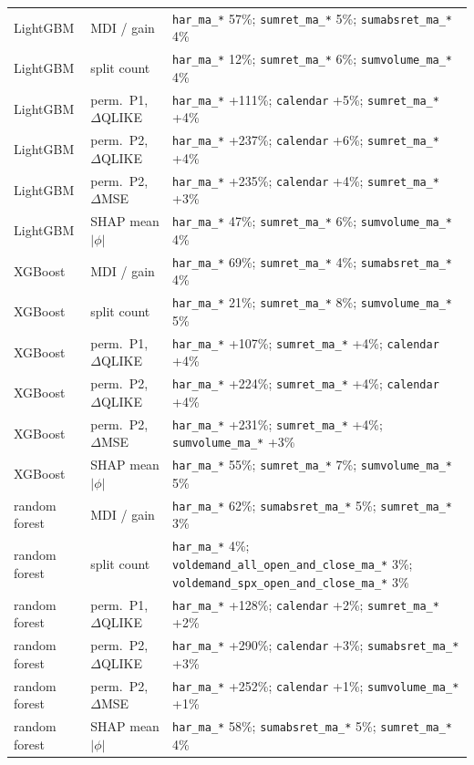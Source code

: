 \documentclass[10pt]{article}
\begin{document}
\begin{table}[H]
\begin{tabular}{llp{11.2cm}}
LightGBM & MDI / gain & \texttt{har\_ma\_*} 57\%; \texttt{sumret\_ma\_*} 5\%; \texttt{sumabsret\_ma\_*} 4\% \\
LightGBM & split count & \texttt{har\_ma\_*} 12\%; \texttt{sumret\_ma\_*} 6\%; \texttt{sumvolume\_ma\_*} 4\% \\
LightGBM & perm.\ P1, $\Delta$QLIKE & \texttt{har\_ma\_*} +111\%; \texttt{calendar} +5\%; \texttt{sumret\_ma\_*} +4\% \\
LightGBM & perm.\ P2, $\Delta$QLIKE & \texttt{har\_ma\_*} +237\%; \texttt{calendar} +6\%; \texttt{sumret\_ma\_*} +4\% \\
LightGBM & perm.\ P2, $\Delta$MSE & \texttt{har\_ma\_*} +235\%; \texttt{calendar} +4\%; \texttt{sumret\_ma\_*} +3\% \\
LightGBM & SHAP mean $|\phi|$ & \texttt{har\_ma\_*} 47\%; \texttt{sumret\_ma\_*} 6\%; \texttt{sumvolume\_ma\_*} 4\% \\
XGBoost & MDI / gain & \texttt{har\_ma\_*} 69\%; \texttt{sumret\_ma\_*} 4\%; \texttt{sumabsret\_ma\_*} 4\% \\
XGBoost & split count & \texttt{har\_ma\_*} 21\%; \texttt{sumret\_ma\_*} 8\%; \texttt{sumvolume\_ma\_*} 5\% \\
XGBoost & perm.\ P1, $\Delta$QLIKE & \texttt{har\_ma\_*} +107\%; \texttt{sumret\_ma\_*} +4\%; \texttt{calendar} +4\% \\
XGBoost & perm.\ P2, $\Delta$QLIKE & \texttt{har\_ma\_*} +224\%; \texttt{sumret\_ma\_*} +4\%; \texttt{calendar} +4\% \\
XGBoost & perm.\ P2, $\Delta$MSE & \texttt{har\_ma\_*} +231\%; \texttt{sumret\_ma\_*} +4\%; \texttt{sumvolume\_ma\_*} +3\% \\
XGBoost & SHAP mean $|\phi|$ & \texttt{har\_ma\_*} 55\%; \texttt{sumret\_ma\_*} 7\%; \texttt{sumvolume\_ma\_*} 5\% \\
random forest & MDI / gain & \texttt{har\_ma\_*} 62\%; \texttt{sumabsret\_ma\_*} 5\%; \texttt{sumret\_ma\_*} 3\% \\
random forest & split count & \texttt{har\_ma\_*} 4\%; \texttt{voldemand\_all\_open\_and\_close\_ma\_*} 3\%; \texttt{voldemand\_spx\_open\_and\_close\_ma\_*} 3\% \\
random forest & perm.\ P1, $\Delta$QLIKE & \texttt{har\_ma\_*} +128\%; \texttt{calendar} +2\%; \texttt{sumret\_ma\_*} +2\% \\
random forest & perm.\ P2, $\Delta$QLIKE & \texttt{har\_ma\_*} +290\%; \texttt{calendar} +3\%; \texttt{sumabsret\_ma\_*} +3\% \\
random forest & perm.\ P2, $\Delta$MSE & \texttt{har\_ma\_*} +252\%; \texttt{calendar} +1\%; \texttt{sumvolume\_ma\_*} +1\% \\
random forest & SHAP mean $|\phi|$ & \texttt{har\_ma\_*} 58\%; \texttt{sumabsret\_ma\_*} 5\%; \texttt{sumret\_ma\_*} 4\% \\
\bottomrule\end{tabular}\end{table}
\end{document}
